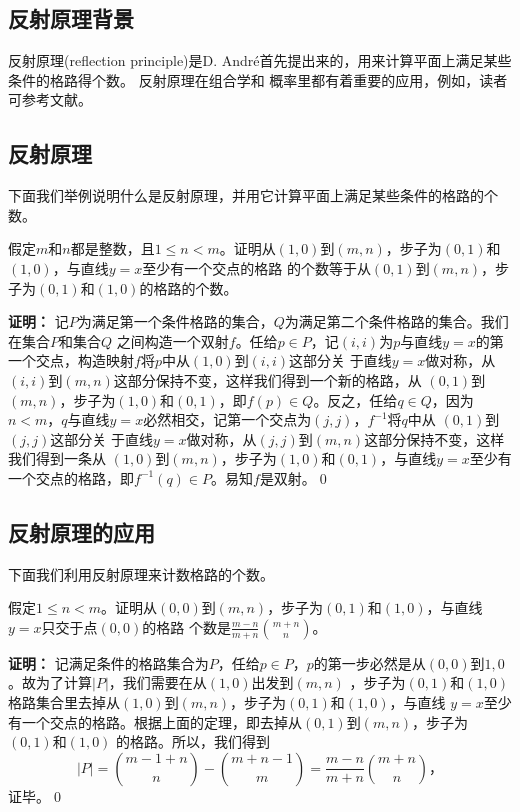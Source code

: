 \subsection{反射原理背景}
反射原理(reflection principle)是D.
Andr\'e\cite{Andre1887}首先提出来的，用来计算平面上满足某些条件的格路得个数。
反射原理在组合学和
概率里都有着重要的应用，例如，读者可参考文献\cite{Andre1887,
Feller1950, Mohanty1979,  Narayana1979,  Stanley1999,  Takacs1967}。
\subsection{反射原理}
下面我们举例说明什么是反射原理，并用它计算平面上满足某些条件的格路的个数。
\begin{thm}
假定$m$和$n$都是整数，且$1\leq
n<m$。证明从$(1,0)$到$(m,n)$，步子为$(0,1)$和$(1,0)$，与直线$y=x$至少有一个交点的格路
的个数等于从$(0,1)$到$(m,n)$，步子为$(0,1)$和$(1,0)$的格路的个数。
\end{thm}
{\bf{证明：}}
记$P$为满足第一个条件格路的集合，$Q$为满足第二个条件格路的集合。我们在集合$P$和集合$Q$
之间构造一个双射$f$。任给$p\in
P$，记$(i,i)$为$p$与直线$y=x$的第一个交点，构造映射$f$将$p$中从$(1,0)$到$(i,i)$这部分关
于直线$y=x$做对称，从$(i,i)$到$(m,n)$这部分保持不变，这样我们得到一个新的格路，从
$(0,1)$到$(m,n)$，步子为$(1,0)$和$(0,1)$，即$f(p)\in
Q$。反之，任给$q\in
Q$，因为$n<m$，$q$与直线$y=x$必然相交，记第一个交点为$(j,j)$，$f^{-1}$将$q$中从
$(0,1)$到$(j,j)$这部分关
于直线$y=x$做对称，从$(j,j)$到$(m,n)$这部分保持不变，这样我们得到一条从
$(1,0)$到$(m,n)$，步子为$(1,0)$和$(0,1)$，与直线$y=x$至少有一个交点的格路，即$f^{-1}(q)\in
P$。易知$f$是双射。\qed
\subsection{反射原理的应用}
下面我们利用反射原理来计数格路的个数。
\begin{prop}
假定$1\leq
n<m$。证明从$(0,0)$到$(m,n)$，步子为$(0,1)$和$(1,0)$，与直线$y=x$只交于点$(0,0)$的格路
个数是$\frac{m-n}{m+n}{m+n \choose n}$。
\end{prop}
{\bf{证明：}} 记满足条件的格路集合为$P$，任给$p\in
P$，$p$的第一步必然是从$(0,0)$到$1,0$。故为了计算$|P|$，我们需要在从$(1,0)$出发到$(m,n)$
，步子为$(0,1)$和$(1,0)$格路集合里去掉从$(1,0)$到$(m,n)$，步子为$(0,1)$和$(1,0)$，与直线
$y=x$至少有一个交点的格路。根据上面的定理，即去掉从$(0,1)$到$(m,n)$，步子为$(0,1)$和$(1,0)$
的格路。所以，我们得到
\begin{equation*}
|P|={m-1+n \choose n}-{m+n-1\choose m}=\frac{m-n}{m+n}{m+n \choose
n}，
\end{equation*}
证毕。\qed

